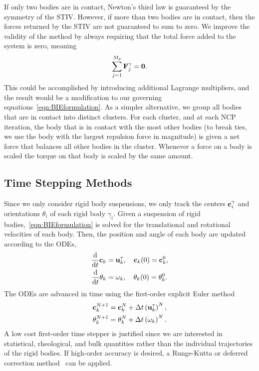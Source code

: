 \documentclass[AMA,STIX1COL]{WileyNJD-v2}
\begin{document}
If only two bodies are in contact, Newton's third law is guaranteed by
the symmetry of the STIV.  However, if more than two bodies are in
contact, then the forces returned by the STIV are not guaranteed to sum
to zero.  We improve the validity of the method by always requiring that
the total force added to the system is zero, meaning
\begin{align*}
  \sum_{j=1}^{M_p} {\mathbf{F}}^\gamma_j = \mathbf{0}. 
\end{align*}
This could be accomplished by introducing additional Lagrange
multipliers, and the result would be a modification to our governing
equations~\eqref{eqn:BIEformulation}.  As a simpler alternative, we
group all bodies that are in contact into distinct clusters.  For each
cluster, and at each NCP iteration, the body that is in contact with the
most other bodies (to break ties, we use the body with the largest
repulsion force in magnitude) is given a net force that balances all
other bodies in the cluster. Whenever a force on a body is scaled the
torque on that body is scaled by the same amount.

\subsection{Time Stepping Methods}
\label{sec:temporal}
Since we only consider rigid body suspensions, we only track the centers
${\mathbf{c}}_i^\gamma$ and orientations $\theta_i$ of each rigid body
$\gamma_i$. Given a suspension of rigid
bodies,~\eqref{eqn:BIEformulation} is solved for the translational and
rotational velocities of each body. Then, the position and angle of each
body are updated according to the ODEs,
\begin{align*}
  \frac{\text{d}}{\text{d}t}{\mathbf{c}}_k &= {\mathbf{u}}^\tau_k,  
    \quad {\mathbf{c}}_k(0) = {\mathbf{c}}_k^0, \\
  \frac{\text{d}}{\text{d}t}\theta_k &= \omega_k,
    \quad \theta_k(0) = \theta_k^0.
\end{align*}
The ODEs are advanced in time using the first-order explicit Euler
method
\begin{align*}
  {\mathbf{c}}_k^{N+1} &= {\mathbf{c}}_k^N + \Delta t \left({\mathbf{u}}_k^\tau\right)^N, \\
  \theta_k^{N+1} &= \theta_k^N + \Delta t \left(\omega_k\right)^N.
\end{align*}
A low cost first-order time stepper is justified since we are interested
in statistical, rheological, and bulk quantities rather than the
individual trajectories of the rigid bodies.  If high-order accuracy is
desired, a Runge-Kutta or deferred correction method~\cite{Quaife2015,
qua-bir2016} can be applied.
\end{document}
